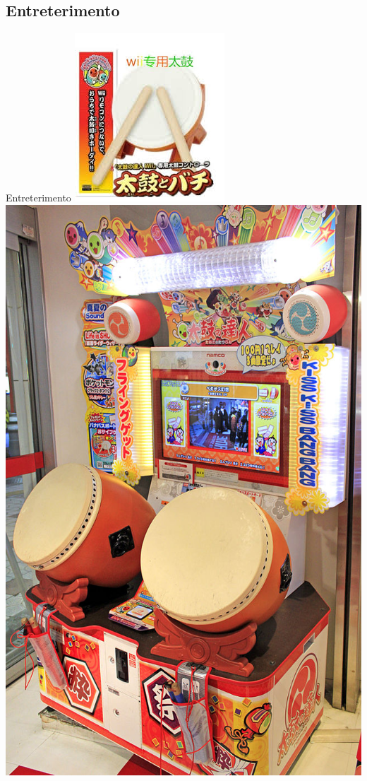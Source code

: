 \documentclass{beamer}
\begin{document}
\subsection {Entreterimento}
\begin{frame}{Entreterimento}
    \includegraphics[height=0.4\textheight]{wii}
    \includegraphics[height=0.4\textheight]{tatsujin}

\end{frame}
\end{document}
